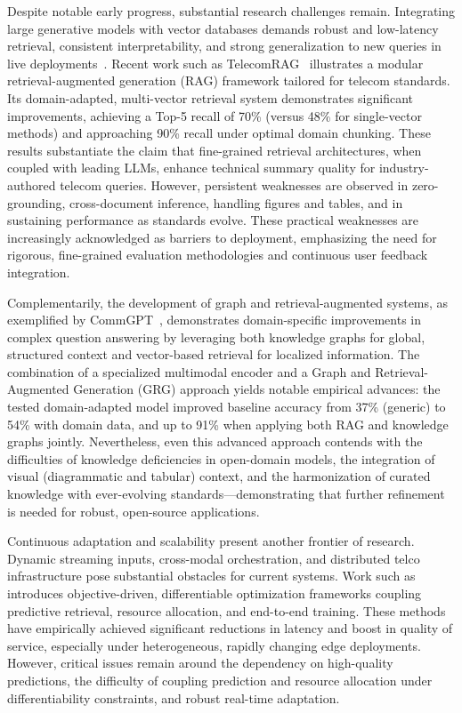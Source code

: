 \documentclass[sigconf]{acmart}
\begin{document}
Despite notable early progress, substantial research challenges remain. Integrating large generative models with vector databases demands robust and low-latency retrieval, consistent interpretability, and strong generalization to new queries in live deployments~\cite{ref20,ref21}. Recent work such as TelecomRAG~\cite{ref20} illustrates a modular retrieval-augmented generation (RAG) framework tailored for telecom standards. Its domain-adapted, multi-vector retrieval system demonstrates significant improvements, achieving a Top-5 recall of 70\% (versus 48\% for single-vector methods) and approaching 90\% recall under optimal domain chunking. These results substantiate the claim that fine-grained retrieval architectures, when coupled with leading LLMs, enhance technical summary quality for industry-authored telecom queries. However, persistent weaknesses are observed in zero-grounding, cross-document inference, handling figures and tables, and in sustaining performance as standards evolve. These practical weaknesses are increasingly acknowledged as barriers to deployment, emphasizing the need for rigorous, fine-grained evaluation methodologies and continuous user feedback integration.

Complementarily, the development of graph and retrieval-augmented systems, as exemplified by CommGPT~\cite{ref21}, demonstrates domain-specific improvements in complex question answering by leveraging both knowledge graphs for global, structured context and vector-based retrieval for localized information. The combination of a specialized multimodal encoder and a Graph and Retrieval-Augmented Generation (GRG) approach yields notable empirical advances: the tested domain-adapted model improved baseline accuracy from 37\% (generic) to 54\% with domain data, and up to 91\% when applying both RAG and knowledge graphs jointly. Nevertheless, even this advanced approach contends with the difficulties of knowledge deficiencies in open-domain models, the integration of visual (diagrammatic and tabular) context, and the harmonization of curated knowledge with ever-evolving standards---demonstrating that further refinement is needed for robust, open-source applications.

Continuous adaptation and scalability present another frontier of research. Dynamic streaming inputs, cross-modal orchestration, and distributed telco infrastructure pose substantial obstacles for current systems. Work such as~\cite{ref48} introduces objective-driven, differentiable optimization frameworks coupling predictive retrieval, resource allocation, and end-to-end training. These methods have empirically achieved significant reductions in latency and boost in quality of service, especially under heterogeneous, rapidly changing edge deployments. However, critical issues remain around the dependency on high-quality predictions, the difficulty of coupling prediction and resource allocation under differentiability constraints, and robust real-time adaptation.
\end{document}
